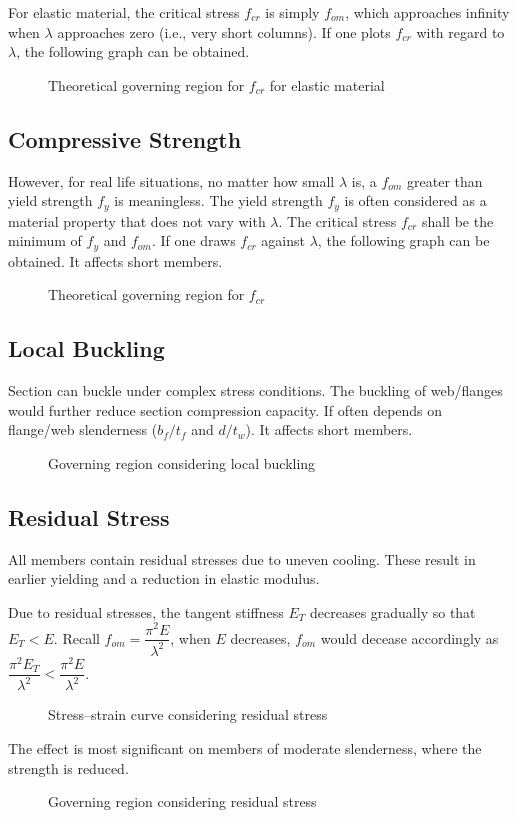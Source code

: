 For elastic material, the critical stress $f_{cr}$ is simply $f_{om}$, which approaches infinity when $\lambda$ approaches zero (i.e., very short columns). If one plots $f_{cr}$ with regard to $\lambda$, the following graph can be obtained.
\begin{figure}[H]
\centering
\caption{Theoretical governing region for $f_{cr}$ for elastic material}
\end{figure}
\subsection{Compressive Strength}
However, for real life situations, no matter how small $\lambda$ is, a $f_{om}$ greater than yield strength $f_y$ is meaningless. The yield strength $f_y$ is often considered as a material property that does not vary with $\lambda$. The critical stress $f_{cr}$ shall be the minimum of $f_y$ and $f_{om}$. If one draws $f_{cr}$ against $\lambda$, the following graph can be obtained. It affects short members.
\begin{figure}[H]
\centering
\caption{Theoretical governing region for $f_{cr}$}
\end{figure}
\subsection{Local Buckling}
Section can buckle under complex stress conditions. The buckling of web/flanges would further reduce section compression capacity. If often depends on flange/web slenderness ($b_f/t_f$ and $d/t_w$). It affects short members.
\begin{figure}[H]
\centering
\caption{Governing region considering local buckling}
\end{figure}
\subsection{Residual Stress}
All members contain residual stresses due to uneven cooling. These result in earlier yielding
and a reduction in elastic modulus.

Due to residual stresses, the tangent stiffness $E_T$ decreases gradually so that $E_T<E$. Recall $f_{om}=\dfrac{\pi^2E}{\lambda^2}$, when $E$ decreases, $f_{om}$ would decease accordingly as $\dfrac{\pi^2E_T}{\lambda^2}<\dfrac{\pi^2E}{\lambda^2}$.
\begin{figure}[H]
\centering
\caption{Stress--strain curve considering residual stress}
\end{figure}
The effect is most significant on members of moderate slenderness, where the strength is reduced.
\begin{figure}[H]
\centering
\caption{Governing region considering residual stress}
\end{figure}

